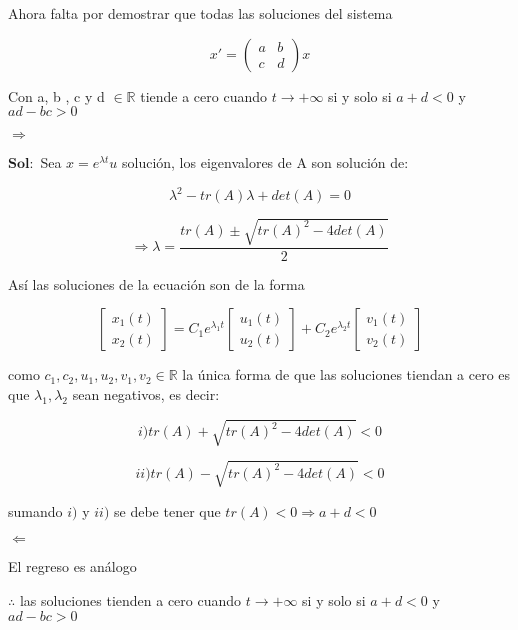 Ahora falta por demostrar que todas las soluciones del sistema

$$x'= \begin{pmatrix}
a & b\\
c & d
\end{pmatrix}x$$

Con a, b , c y d $\in \mathbb{R}$ tiende a cero cuando $t \rightarrow + \infty$ si y solo si $a + d < 0$ y $ad - bc > 0$

$\Rightarrow$

$\mathbf{Sol:}$ Sea $x= e^{\lambda t}u$ solución, los eigenvalores de A son solución de: 

$$\lambda^2 - tr(A)\lambda + det(A)= 0$$

$$\Rightarrow  \lambda = \frac{tr(A) \pm \sqrt{tr(A)^2 - 4det(A)}}{2}$$

Así las soluciones de la ecuación son de la forma 

$$\begin{bmatrix}
x_1(t)\\
x_2(t)
\end{bmatrix}= 
C_1 e^{\lambda_1 t}\begin{bmatrix}
u_1(t)\\
u_2(t)
\end{bmatrix}+
C_2 e^{\lambda_2 t}\begin{bmatrix}
v_1(t)\\
v_2(t)
\end{bmatrix}$$

como $c_1, c_2, u_1, u_2, v_1, v_2 \in \mathbb{R}$ la única forma de que las soluciones tiendan a cero es que $\lambda_1, \lambda_2$ sean negativos, es decir: 

$$ i) tr(A) + \sqrt{tr(A)^2 -4det(A)} < 0 $$

$$ ii) tr(A) - \sqrt{tr(A)^2 -4det(A)} < 0 $$

sumando $i)$ y $ii)$ se debe tener que $tr(A)<0 \Rightarrow a+ d <0$

$\Leftarrow$

El regreso es análogo 

$\therefore$ las soluciones tienden a cero cuando $t \rightarrow + \infty$ si y solo si $a + d <0 $ y $ad -bc >0 $